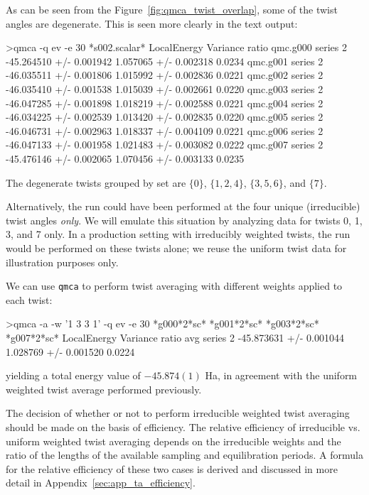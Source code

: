 As can be seen from the Figure~\ref{fig:qmca_twist_overlap}, some of the twist 
angles are degenerate. This is seen more clearly in the text output:
\begin{shade}
>qmca -q ev -e 30 *s002.scalar*
                            LocalEnergy               Variance           ratio 
qmc.g000  series 2  -45.264510 +/- 0.001942   1.057065 +/- 0.002318   0.0234 
qmc.g001  series 2  -46.035511 +/- 0.001806   1.015992 +/- 0.002836   0.0221 
qmc.g002  series 2  -46.035410 +/- 0.001538   1.015039 +/- 0.002661   0.0220 
qmc.g003  series 2  -46.047285 +/- 0.001898   1.018219 +/- 0.002588   0.0221 
qmc.g004  series 2  -46.034225 +/- 0.002539   1.013420 +/- 0.002835   0.0220 
qmc.g005  series 2  -46.046731 +/- 0.002963   1.018337 +/- 0.004109   0.0221 
qmc.g006  series 2  -46.047133 +/- 0.001958   1.021483 +/- 0.003082   0.0222 
qmc.g007  series 2  -45.476146 +/- 0.002065   1.070456 +/- 0.003133   0.0235 
\end{shade}
\noindent
The degenerate twists grouped by set are $\{0\}$, $\{1,2,4\}$, $\{3,5,6\}$, and
$\{7\}$.

Alternatively, the run could have been performed at the four 
unique (irreducible) twist angles \emph{only}.  We will emulate this situation by 
analyzing data for twists 0, 1, 3, and 7 only.  In a production setting 
with irreducibly weighted twists, the run would be performed on these twists 
alone; we reuse the uniform twist data for illustration purposes only.  

We can use \texttt{qmca} to perform twist averaging with different 
weights applied to each twist:
\begin{shade}
>qmca -a -w '1 3 3 1' -q ev -e 30 *g000*2*sc* *g001*2*sc* *g003*2*sc* *g007*2*sc*
                            LocalEnergy               Variance           ratio 
avg  series 2  -45.873631 +/- 0.001044   1.028769 +/- 0.001520   0.0224 
\end{shade}
\noindent
yielding a total energy value of $-45.874(1)$ Ha, in agreement with the 
uniform weighted twist average performed previously.  

The decision of whether or not to perform irreducible weighted twist 
averaging should be made on the basis of efficiency.  The relative 
efficiency of irreducible vs. uniform weighted twist averaging 
depends on the irreducible weights and the ratio of the lengths of 
the available sampling and equilibration periods.  A formula for 
the relative efficiency of these two cases is derived and discussed 
in more detail in Appendix~\ref{sec:app_ta_efficiency}.


